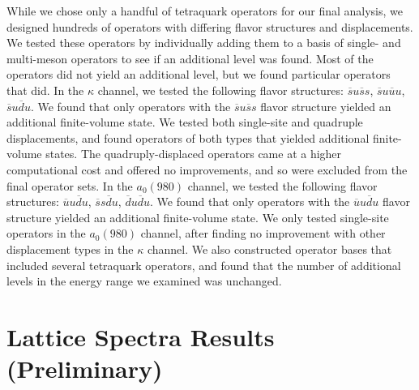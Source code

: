 While we chose only a handful of tetraquark operators for our final analysis, we designed hundreds of operators with differing flavor structures and displacements. We tested these operators by individually adding them to a basis of single- and multi-meson operators to see if an additional level was found. Most of the operators did not yield an additional level, but we found particular operators that did. In the $\kappa$ channel, we tested the following flavor structures: $\overline s u \overline s s$, $\overline s u \overline u u$, $\overline s u \overline d u$. We found that only operators with the $\overline s u \overline s s$ flavor structure yielded an additional finite-volume state. We tested both single-site and quadruple displacements, and found operators of both types that yielded additional finite-volume states. The quadruply-displaced operators came at a higher computational cost and offered no improvements, and so were excluded from the final operator sets. In the $a_0(980)$ channel, we tested the following flavor structures: $\overline u u \overline d u$, $\overline s s \overline d u$, $\overline d u \overline d u$. We found that only operators with the $\overline u u \overline d u$ flavor structure yielded an additional finite-volume state. We only tested single-site operators in the $a_0(980)$ channel, after finding no improvement with other displacement types in the $\kappa$ channel. We also constructed operator bases that included several tetraquark operators, and found that the number of additional levels in the energy range we examined was unchanged.
\section{Lattice Spectra Results (Preliminary)}
